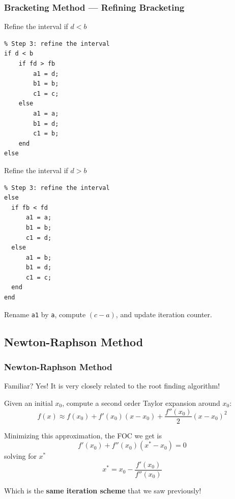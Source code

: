 \documentclass[11pt,xcolor={svgnames},aspectratio=169,usepdftitle=false]{beamer}
\let\toneitemize\itemize
\let\ttwoitemize\enditemize
\renewenvironment{itemize}{\toneitemize\addtolength{\itemsep}{0.7\baselineskip}}{\ttwoitemize}
\begin{document}
\begin{frame}[fragile]
  \frametitle{Bracketing Method --- Refining Bracketing}
\begin{minipage}{0.48\textwidth}
  \begin{itemize}
    \item Refine the interval if $d < b$
    \begin{lstlisting}
% Step 3: refine the interval
if d < b
    if fd > fb
        a1 = d;
        b1 = b;
        c1 = c;
    else
        a1 = a;
        b1 = d;
        c1 = b;
    end
else
    \end{lstlisting}
  \end{itemize}
\end{minipage}
\begin{minipage}{0.48\textwidth}
  \begin{itemize}
    \item Refine the interval if $d > b$
    \begin{lstlisting}
% Step 3: refine the interval
else
  if fb < fd
      a1 = a;
      b1 = b;
      c1 = d;
  else
      a1 = b;
      b1 = d;
      c1 = c;
  end
end
    \end{lstlisting}
  \end{itemize}
\end{minipage}
Rename \verb;a1; by \verb;a;, compute $(c - a)$, and update iteration counter.
\end{frame}

\subsection{Newton-Raphson Method}

\begin{frame}
  \frametitle{Newton-Raphson Method}
\begin{itemize}
  \item Familiar? Yes! It is very closely related to the root finding algorithm!
  \item Given an initial $x_0$, compute a second order Taylor expansion around $x_0$:
  \[
  f(x) \approx f(x_0) + f'(x_0)(x - x_0) + \frac{f''(x_0)}{2}(x - x_0)^2
  \]
  \item Minimizing this approximation, the FOC we get is
  \[
  f'(x_0) + f''(x_0)(x^* - x_0) = 0
  \]
  solving for $x^*$
  \[
  x^* = x_0 - \frac{f'(x_0)}{f''(x_0)}
  \]
  \item Which is the \alert{\textbf{same iteration scheme}} that we saw previously!
\end{itemize}
\end{frame}
\end{document}
